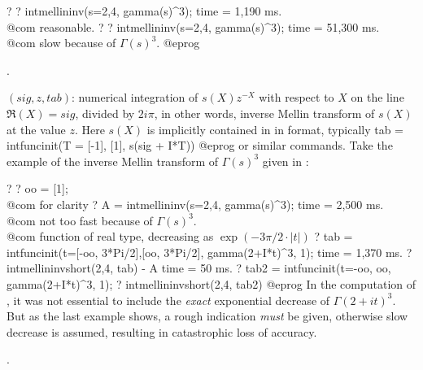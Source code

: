\bprog
? 
? intmellininv(s=2,4, gamma(s)^3);
time = 1,190 ms. \\@com reasonable.
? 
? intmellininv(s=2,4, gamma(s)^3);
time = 51,300 ms. \\@com slow because of $\Gamma(s)^3$.
@eprog\noindent

.

$(sig,z,tab)$: numerical integration
of $s(X)z^{-X}$ with respect to $X$ on the line $\Re(X)=sig$, divided by
$2i\pi$, in other words, inverse Mellin transform of $s(X)$ at the value $z$.
Here $s(X)$ is implicitly contained in  in  format,
typically
\bprog
  tab = intfuncinit(T = [-1], [1], s(sig + I*T))
@eprog\noindent
or similar commands. Take the example of the inverse Mellin transform of
$\Gamma(s)^3$ given in :

\bprog
? 
? oo = [1]; \\@com for clarity
? A = intmellininv(s=2,4, gamma(s)^3);
time = 2,500 ms. \\@com not too fast because of $\Gamma(s)^3$.
\\ @com function of real type, decreasing as $\exp(-3\pi/2\cdot |t|)$
? tab = intfuncinit(t=[-oo, 3*Pi/2],[oo, 3*Pi/2], gamma(2+I*t)^3, 1);
time = 1,370 ms.
? intmellininvshort(2,4, tab) - A
time = 50 ms.
? tab2 = intfuncinit(t=-oo, oo, gamma(2+I*t)^3, 1);
? intmellininvshort(2,4, tab2)
@eprog\noindent
In the computation of , it was not essential to include the
\emph{exact} exponential decrease of $\Gamma(2+it)^3$. But as the last
example shows, a rough indication \emph{must} be given, otherwise slow
decrease is assumed, resulting in catastrophic loss of accuracy.

.

